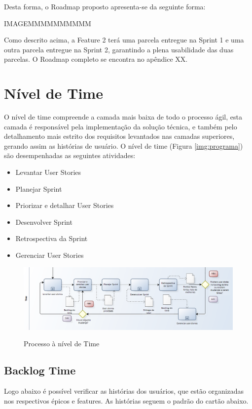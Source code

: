 Desta forma, o Roadmap proposto apresenta-se da seguinte forma:

IMAGEMMMMMMMMMM

Como descrito acima, a Feature 2 terá uma parcela entregue na Sprint 1 e uma outra parcela entregue na Sprint 2, garantindo a plena usabilidade das duas parcelas.
O Roadmap completo se encontra no apêndice XX.

\section{Nível de Time}

O nível de time compreende a camada mais baixa de todo o processo ágil, esta camada é responsável pela implementação da solução técnica, e também pelo detalhamento mais estrito dos requisitos levantados nas camadas superiores, gerando assim as histórias de usuário. O nível de time (Figura \ref{img:programa}) são desempenhadas as seguintes atividades:

\begin{itemize}
\item Levantar User Stories
\item Planejar Sprint
\item Priorizar e detalhar User Stories
\item Desenvolver Sprint
\item Retrospectiva da Sprint
\item Gerenciar User Stories
\end{itemize}

\FloatBarrier
\begin{figure}[!htpd]
		\centering
		\includegraphics[scale=0.4]{figuras/time}
		\label{img:time}
		\caption{Processo à nível de Time}
\end{figure}

\subsection{Backlog Time}

Logo abaixo é possível verificar as histórias dos usuários, que estão organizadas nos respectivos épicos e features. As histórias seguem o padrão do cartão abaixo.

